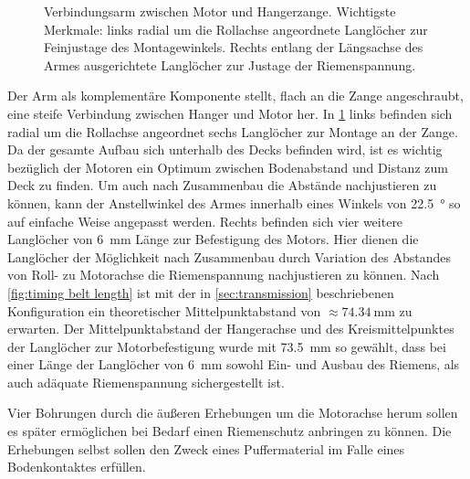 		\begin{figure}[h]
			\centering
			
			\caption[Verbindungsarm zwischen Motor und Hangerzange]{Verbindungsarm zwischen Motor und Hangerzange. Wichtigste Merkmale: links radial um die Rollachse angeordnete Langlöcher zur Feinjustage des Montagewinkels. Rechts entlang der Längsachse des Armes ausgerichtete Langlöcher zur Justage der Riemenspannung.}%
			\label{fig:motor piece drawing}
		\end{figure}
		\newpage
		Der Arm als komplementäre Komponente stellt, flach an die Zange angeschraubt, eine steife Verbindung zwischen Hanger und Motor her.
		In \cref{fig:motor piece drawing} links befinden sich radial um die Rollachse angeordnet sechs Langlöcher zur Montage an der Zange.
		Da der gesamte Aufbau sich unterhalb des Decks befinden wird, ist es wichtig bezüglich der Motoren ein Optimum zwischen Bodenabstand und Distanz zum Deck zu finden.
		Um auch nach Zusammenbau die Abstände nachjustieren zu können, kann der Anstellwinkel des Armes innerhalb eines Winkels von \qty{22,5}{\degree} so auf einfache Weise angepasst werden.
		Rechts befinden sich vier weitere Langlöcher von \qty{6}{\milli\metre} Länge zur Befestigung des Motors.
		Hier dienen die Langlöcher der Möglichkeit nach Zusammenbau durch Variation des Abstandes von Roll- zu Motorachse die Riemenspannung nachjustieren zu können.
		Nach \cref{fig:timing belt length} ist mit der in \cref{sec:transmission} beschriebenen Konfiguration ein theoretischer Mittelpunktabstand von \(\approx \qty{74,34}{\milli\metre}\) zu erwarten.
		Der Mittelpunktabstand der Hangerachse und des Kreismittelpunktes der Langlöcher zur Motorbefestigung wurde mit \qty{73,5}{\milli\metre} so gewählt, dass bei einer Länge der Langlöcher von \qty{6}{\milli\metre} sowohl Ein- und Ausbau des Riemens, als auch adäquate Riemenspannung sichergestellt ist.

		Vier Bohrungen durch die äußeren Erhebungen um die Motorachse herum sollen es später ermöglichen bei Bedarf einen Riemenschutz anbringen zu können.
		Die Erhebungen selbst sollen den Zweck eines Puffermaterial im Falle eines Bodenkontaktes erfüllen.